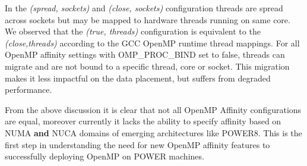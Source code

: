 In the \textit{(spread, sockets)} and \textit{(close, sockets)} configuration threads are spread across sockets but may be mapped to hardware threads running on same core. We observed that the \textit{(true, threads)} configuration is equivalent to the \textit{(close,threads)} according to the GCC OpenMP runtime thread mappings.
For all OpenMP affinity settings  with OMP\_PROC\_BIND set to false, threads can migrate and are not bound to a specific thread, core or socket. This migration makes it less impactful on the data placement, but suffers from degraded performance.

From the above discussion it is clear that not all OpenMP Affinity configurations are equal, moreover currently it lacks the ability to specify affinity based on NUMA \textbf{and} NUCA domains of emerging architectures like POWER8. This is the first step in understanding the need for new OpenMP affinity features to successfully deploying OpenMP on POWER machines. %

